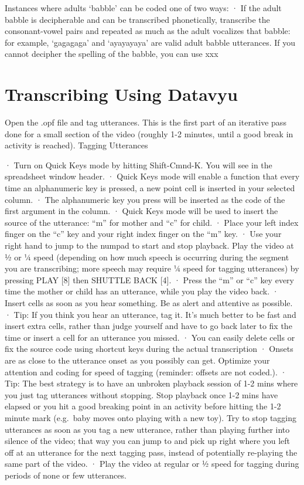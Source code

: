 \documentclass[
]{book}
\begin{document}
Instances where adults `babble' can be coded one of two ways:
· If the adult babble is decipherable and can be transcribed phonetically, transcribe the consonant-vowel pairs and repeated as much as the adult vocalizes that babble: for example, `gagagaga' and `ayayayaya' are valid adult babble utterances.
If you cannot decipher the spelling of the babble, you can use xxx

\hypertarget{transcribing-using-datavyu}{%
\section{Transcribing Using Datavyu}\label{transcribing-using-datavyu}}

Open the .opf file and tag utterances. This is the first part of an iterative pass done for a small section of the video (roughly 1-2 minutes, until a good break in activity is reached).
Tagging Utterances

· Turn on Quick Keys mode by hitting Shift-Cmnd-K. You will see in the spreadsheet window header.
· Quick Keys mode will enable a function that every time an alphanumeric key is pressed, a new point cell is inserted in your selected column.
· The alphanumeric key you press will be inserted as the code of the first argument in the column.
· Quick Keys mode will be used to insert the source of the utterance: ``m'' for mother and ``c'' for child.
· Place your left index finger on the ``c'' key and your right index finger on the ``m'' key.
· Use your right hand to jump to the numpad to start and stop playback. Play the video at ½ or ¼ speed (depending on how much speech is occurring during the segment you are transcribing; more speech may require ¼ speed for tagging utterances) by pressing PLAY {[}8{]} then SHUTTLE BACK {[}4{]}.
· Press the ``m'' or ``c'' key every time the mother or child has an utterance, while you play the video back.
· Insert cells as soon as you hear something. Be as alert and attentive as possible.
· Tip: If you think you hear an utterance, tag it. It's much better to be fast and insert extra cells, rather than judge yourself and have to go back later to fix the time or insert a cell for an utterance you missed.
· You can easily delete cells or fix the source code using shortcut keys during the actual transcription
· Onsets are as close to the utterance onset as you possibly can get. Optimize your attention and coding for speed of tagging (reminder: offsets are not coded.).
· Tip: The best strategy is to have an unbroken playback session of 1-2 mins where you just tag utterances without stopping. Stop playback once 1-2 mins have elapsed or you hit a good breaking point in an activity before hitting the 1-2 minute mark (e.g.~baby moves onto playing with a new toy). Try to stop tagging utterances as soon as you tag a new utterance, rather than playing further into silence of the video; that way you can jump to and pick up right where you left off at an utterance for the next tagging pass, instead of potentially re-playing the same part of the video.
· Play the video at regular or ½ speed for tagging during periods of none or few utterances.
\end{document}
